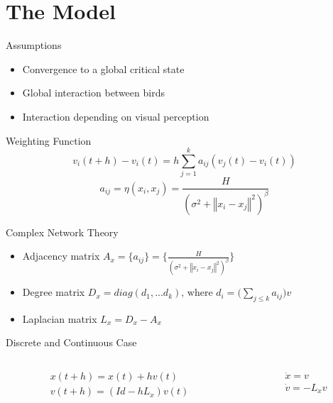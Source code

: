 \documentclass{beamer}
\begin{document}
\section{The Model}
\begin{frame}{Assumptions}
\begin{itemize}
  \item Convergence to a global critical state
  \vspace{0.5cm}
  \item Global interaction between birds
  \vspace{0.5cm}
  \item Interaction depending on visual perception
\end{itemize}
\end{frame}
\begin{frame}{Weighting Function}
	\begin{equation}
		v_i(t+h)-v_i(t)=h\sum_{j=1}^k a_{ij}(v_j(t)-v_i(t))\nonumber
	\end{equation}
  \vspace{1cm}
	\begin{equation}
		a_{ij}=\eta(x_i,x_j)=\frac{H}{(\sigma^2+\left\Vert x_i - x_j \right\Vert^2)^{\beta}}\nonumber
	\end{equation}
\end{frame}
\begin{frame}{Complex Network Theory}
	\begin{itemize}
		\item Adjacency matrix $A_x = \lbrace a_{ij}\rbrace=\bigg\lbrace\frac{H}{(\sigma^2+\left\Vert x_i - x_j \right\Vert^2)^{\beta}}\bigg\rbrace\nonumber$
		\vspace{0.5cm}
		\item Degree matrix $D_x = diag(d_1,...d_k) \text{, where } d_i=\bigg(\sum_{j\leq k}a_{ij}\bigg)v$
		\vspace{0.5cm}
		\item Laplacian matrix $L_x = D_x - A_x$
	\end{itemize}
\end{frame}
\begin{frame}{Discrete and Continuous Case}
	\begin{minipage}[0.95\textheight]{\textwidth}
	\begin{columns}[T]
	\begin{column}{0.5\textwidth}
		\begin{align}
			&x(t+h) = x(t) + hv(t)\nonumber\\
			&v(t+h) = (Id -hL_x)v(t)\nonumber
		\end{align}
	\end{column}
	\begin{column}{0.5\textwidth}
		\begin{align}
			&\dot{x} = v\nonumber\\
			&\dot{v} = -L_xv\nonumber
		\end{align}
	\end{column}
	\end{columns}
	\end{minipage}
\end{frame}
\end{document}
